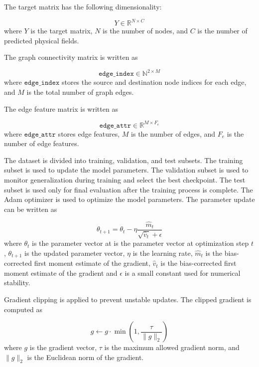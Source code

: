 The target matrix has the following dimensionality:

\begin{equation}
Y
\in
\mathbb{R}^{N \times C}
\end{equation}
where \(Y\) is the target matrix, \(N\) is the number of nodes, and \(C\) is the number of predicted physical fields.

The graph connectivity matrix is written as

\begin{equation}
\texttt{edge\_index}
\in
\mathbb{N}^{2 \times M}
\end{equation}
where \(\texttt{edge\_index}\) stores the source and destination node indices for each edge, and \(M\) is the total number of graph edges.

The edge feature matrix is written as

\begin{equation}
\texttt{edge\_attr}
\in
\mathbb{R}^{M \times F_e}
\end{equation}
where \(\texttt{edge\_attr}\) stores edge features, \(M\) is the number of edges, and \(F_e\) is the number of edge features.

The dataset is divided into training, validation, and test subsets. The training subset is used to update the model parameters. The validation subset is used to monitor generalization during training and select the best checkpoint. The test subset is used only for final evaluation after the training process is complete.
The Adam optimizer is used to optimize the model parameters. The parameter update can be written as

\begin{equation}
\theta_{t+1}
=
\theta_t
-
\eta
\frac{\hat{m}_t}{\sqrt{\hat{v}_t}+\epsilon}
\end{equation}
where \(\theta_t\) is the parameter vector at is the parameter vector at optimization step \(t\), \(\theta_{t+1}\) is the updated parameter vector, \(\eta\) is the learning rate, \(\hat{m}_t\) is the bias-corrected first moment estimate of the gradient, \(\hat{v}_t\) is the bias-corrected first moment estimate of the gradient and \(\epsilon\) is a small constant used for numerical stability.

Gradient clipping is applied to prevent unstable updates. The clipped gradient is computed as

\begin{equation}
g
\leftarrow
g
\cdot
\min
\left(
1,
\frac{\tau}{\|g\|_2}
\right)
\end{equation}
where \(g\) is the gradient vector, \(\tau\) is the maximum allowed gradient norm, and \(\|g\|_2\) is the Euclidean norm of the gradient.

